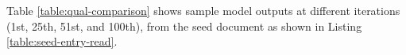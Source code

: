 Table \ref{table:qual-comparison} shows sample model outputs at different iterations (1st, 25th, 51st, and 100th), from the seed document \cite{du-etal-2022-read} as shown in Listing \ref{table:seed-entry-read}.







